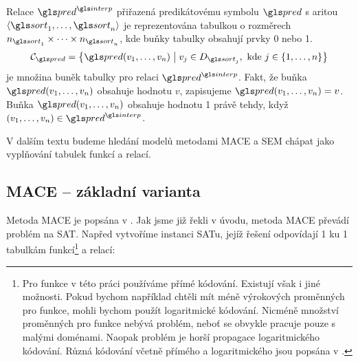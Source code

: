 Relace $\pred^\interp$
přiřazená predikátovému symbolu $\pred$ s aritou
$\langle \sort_1 \comdots \sort_n \rangle$
je reprezentována tabulkou o rozměrech $n_{\sort_1} \timdots n_{\sort_n}$,
kde buňky tabulky obsahují prvky 0 nebo 1.
\[
\cells_\pred = \bigl\{ \pred(v_1 \comdots v_n) \bigm| v_j \in D_{\sort_j},
  \text{ kde } j \in \{ 1 \comdots n  \}  \bigr\}
\]
je množina buněk tabulky pro relaci $\pred^\interp$.
Fakt, že buňka $\pred(v_1 \comdots v_n)$ obsahuje hodnotu $v$,
zapisujeme $\pred(v_1 \comdots v_n) = v$.
Buňka $\pred(v_1 \comdots v_n)$ obsahuje hodnotu 1
právě tehdy, když $(v_1 \comdots v_n) \in \pred^\interp$.


V dalším textu budeme hledání modelů metodami MACE a SEM chápat jako
vyplňování tabulek funkcí a relací.

\subsection{MACE -- základní varianta} \label{sec:mace-basic}

Metoda MACE je popsána v \cite{mccune94davis-putnam}.
Jak jsme již řekli v úvodu, metoda MACE převádí problém na SAT.
Napřed vytvoříme instanci SATu, jejíž řešení odpovídají 1 ku 1
tabulkám funkcí\footnote{Pro funkce v této práci používáme přímé kódování.
Existují však i jiné možnosti.
Pokud bychom například chtěli mít méně
výrokových proměnných pro funkce, mohli bychom použít logaritmické kódování.
Nicméně množství proměnných pro funkce nebývá problém,
neboť se obvykle pracuje pouze s malými doménami.
Naopak problém je horší propagace logaritmického kódování.
Různá kódování včetně přímého a logaritmického jsou popsána
v \cite{gavanelli2007}.} a relací:


